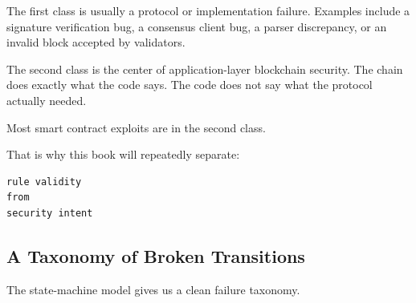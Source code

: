 The first class is usually a protocol or implementation failure.
Examples include a signature verification bug, a consensus client bug, a
parser discrepancy, or an invalid block accepted by validators.

The second class is the center of application-layer blockchain security.
The chain does exactly what the code says. The code does not say what
the protocol actually needed.

Most smart contract exploits are in the second class.

That is why this book will repeatedly separate:

\begin{lstlisting}
rule validity
from
security intent
\end{lstlisting}

\subsection{A Taxonomy of Broken Transitions}

The state-machine model gives us a clean failure taxonomy.


